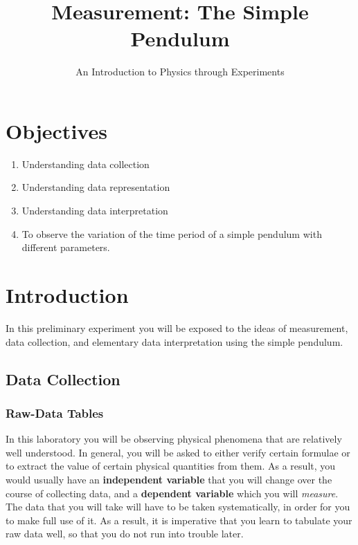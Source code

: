 \title{Measurement: The Simple Pendulum}
\author{An Introduction to Physics through Experiments}
\date{}

\maketitle

\section{Objectives}

\begin{enumerate}
    \item Understanding data collection
    \item Understanding data representation
    \item Understanding data interpretation
    \item To observe the variation of the time period of a simple pendulum with different parameters.
\end{enumerate}

\section{Introduction}

In this preliminary experiment you will be exposed to the ideas of measurement, data collection, and elementary data interpretation using the simple pendulum. 

\subsection{Data Collection}

\subsubsection{Raw-Data Tables}

In this laboratory you will be observing physical phenomena that are relatively well understood. In general, you will be asked to either verify certain formulae or to extract the value of certain physical quantities from them. As a result, you would usually have an \textbf{independent variable} that you will change over the course of collecting data, and a \textbf{dependent variable} which you will \textit{measure}. The data that you will take will have to be taken systematically, in order for you to make full use of it. As a result, it is imperative that you learn to tabulate your raw data well, so that you do not run into trouble later.

